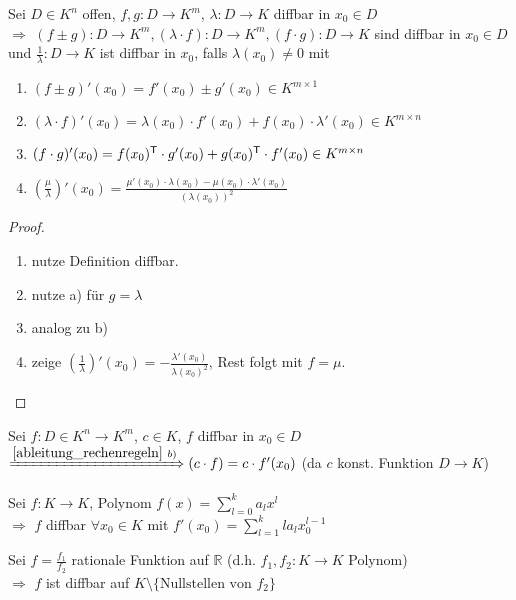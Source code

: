 \begin{proposition}[Rechenregeln]
	Sei $D\in K^n$ offen, $f,g: D\to K^m$, $\lambda: D\to K$  \gls{diffbar} in $x_0\in D$ \\
	$\Rightarrow$ $(f\pm g): D\to K^m, (\lambda\cdot f):D\to K^m, (f\cdot g):D\to K$ sind  \gls{diffbar} in $x_0\in D$ und $\frac{1}{\lambda}:D\to K$ ist  \gls{diffbar} in $x_0$, falls $\lambda(x_0)\neq 0$
	mit
	\begin{enumerate}[label={\alph*)}]
		\item $(f\pm g)'(x_0) = f'(x_0) \pm g'(x_0)\in K^{m\times 1}$
		\item $(\lambda\cdot f)'(x_0) = \lambda (x_0)\cdot f'(x_0) + f(x_0)\cdot \lambda'(x_0)\in K^{m\times n}$
		\item $(f\cdot g)' (x_0) = f(x_0)^\mathsf{T}\cdot g'(x_0) + g(x_0)^\mathsf{T}\cdot f'(x_0)\in K^{m\times n}$
		\item $\left( \frac{\mu}{\lambda}\right)'(x_0) = \frac{\mu'(x_0)\cdot\lambda(x_0)-\mu(x_0)\cdot \lambda'(x_0)}{(\lambda(x_0))^2}$
	\end{enumerate}
\end{proposition}
\begin{proof}
	\begin{enumerate}
		\item nutze Definition diffbar.
		\item nutze a) für $g=\lambda$
		\item analog zu b)
		\item zeige $\left(\frac{1}{\lambda}\right)'(x_0)=-\frac{\lambda'(x_0)}{\lambda(x_0)^2}$, Rest folgt mit $f=\mu$.
	\end{enumerate}
\end{proof}

\begin{example}
	Sei $f:D\in K^n\to K^m$, $c\in K$, $f$  \gls{diffbar} in $x_0\in D$\\
	$\xRightarrow{\ref{ableitung_rechenregeln}\ b)} (c\cdot f) = c\cdot f'(x_0)$ (da $c$ konst. Funktion $D\to K$)
\end{example}

\begin{example}[Polynom]
	Sei $f:K\to K$, Polynom $f(x) = \sum\limits_{l=0}^{k}a_l x^l$ \\
	$\Rightarrow$ $f$  \gls{diffbar} $\forall x_0\in K$ mit $f'(x_0) = \sum\limits_{l=1}^k l a_l x_0^{l-1}$
\end{example}

\begin{example}
	Sei $f=\frac{f_1}{f_2}$ rationale Funktion auf $\mathbb{R}$ (d.h. $f_1, f_2:K\to K$ Polynom) \\
	$\Rightarrow$ $f$ ist  \gls{diffbar} auf $K\setminus \{ \text{Nullstellen von }f_2 \}$
\end{example}


